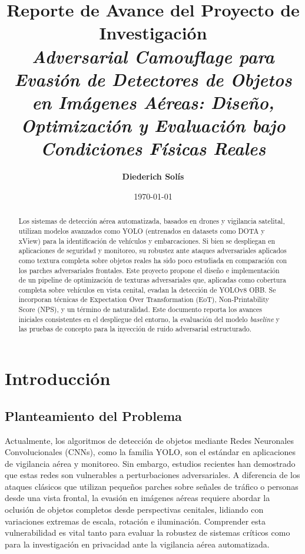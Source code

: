 \documentclass[12pt,a4paper]{article}
\title{\textbf{Reporte de Avance del Proyecto de Investigación} \\ \vspace{0.5cm} \Large \textit{Adversarial Camouflage para Evasión de Detectores de Objetos en Imágenes Aéreas: Diseño, Optimización y Evaluación bajo Condiciones Físicas Reales}}
\author{\textbf{Diederich Solís}}
\date{\today}
\begin{document}
\maketitle

\begin{abstract}
Los sistemas de detección aérea automatizada, basados en drones y vigilancia satelital, utilizan modelos avanzados como YOLO (entrenados en datasets como DOTA y xView) para la identificación de vehículos y embarcaciones. Si bien se despliegan en aplicaciones de seguridad y monitoreo, su robustez ante ataques adversariales aplicados como textura completa sobre objetos reales ha sido poco estudiada en comparación con los parches adversariales frontales. Este proyecto propone el diseño e implementación de un pipeline de optimización de texturas adversariales que, aplicadas como cobertura completa sobre vehículos en vista cenital, evadan la detección de YOLOv8 OBB. Se incorporan técnicas de Expectation Over Transformation (EoT), Non-Printability Score (NPS), y un término de naturalidad. Este documento reporta los avances iniciales consistentes en el despliegue del entorno, la evaluación del modelo \textit{baseline} y las pruebas de concepto para la inyección de ruido adversarial estructurado.
\end{abstract}

\vspace{0.5cm}

\tableofcontents
\newpage

\section{Introducción}

\subsection{Planteamiento del Problema}
Actualmente, los algoritmos de detección de objetos mediante Redes Neuronales Convolucionales (CNNs), como la familia YOLO, son el estándar en aplicaciones de vigilancia aérea y monitoreo. Sin embargo, estudios recientes han demostrado que estas redes son vulnerables a perturbaciones adversariales. A diferencia de los ataques clásicos que utilizan pequeños parches sobre señales de tráfico o personas desde una vista frontal, la evasión en imágenes aéreas requiere abordar la oclusión de objetos completos desde perspectivas cenitales, lidiando con variaciones extremas de escala, rotación e iluminación. Comprender esta vulnerabilidad es vital tanto para evaluar la robustez de sistemas críticos como para la investigación en privacidad ante la vigilancia aérea automatizada.
\end{document}
